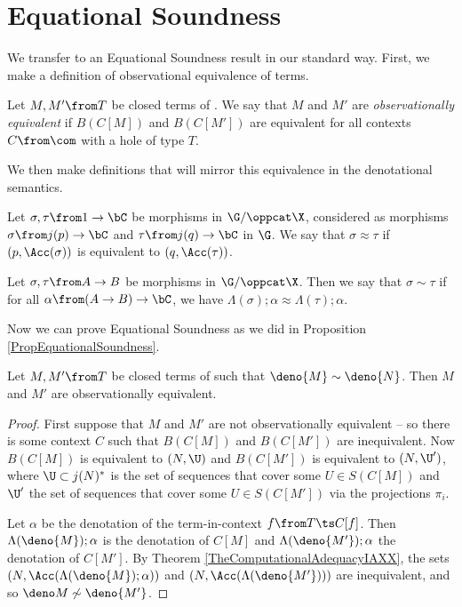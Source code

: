 \section{Equational Soundness}

We transfer to an Equational Soundness result in our standard way.
First, we make a definition of observational equivalence of \IAXX terms.

\begin{definition}
  Let $M,M'\from T$ be closed terms of \IAXX.  
  We say that $M$ and $M'$ are \emph{observationally equivalent} if $B(C[M])$ and $B(C[M'])$ are equivalent for all contexts $C\from \com$ with a hole of type $T$.
\end{definition}

We then make definitions that will mirror this equivalence in the denotational semantics.

\begin{definition}
  Let $\sigma,\tau\from 1 \to \bC$ be morphisms in $\G/\oppcat\X$, considered as morphisms $\sigma\from j(p) \to \bC$ and $\tau \from j(q) \to \bC$ in $\G$.  
  We say that $\sigma\approx\tau$ if $(p,\Acc(\sigma))$ is equivalent to $(q,\Acc(\tau))$.
\end{definition}

\begin{definition}
  Let $\sigma,\tau\from A \to B$ be morphisms in $\G/\oppcat\X$.  
  Then we say that $\sigma\sim\tau$ if for all $\alpha\from (A\to B) \to \bC$, we have $\Lambda(\sigma);\alpha \approx \Lambda(\tau);\alpha$.
\end{definition}

Now we can prove Equational Soundness as we did in Proposition \ref{PropEquationalSoundness}.

\begin{theorem}
  Let $M,M'\from T$ be closed terms of \IAXX such that $\deno{M}\sim\deno{N}$.
  Then $M$ and $M'$ are observationally equivalent.
\end{theorem}
\begin{proof}
  First suppose that $M$ and $M'$ are not observationally equivalent -- so there is some context $C$ such that $B(C[M])$ and $B(C[M'])$ are inequivalent.
  Now $B(C[M])$ is equivalent to $(N,\U)$ and $B(C[M'])$ is equivalent to $(N,\U')$, where $\U\subset j(N)^*$ is the set of sequences that cover some $U\in S(C[M])$ and $\U'$ the set of sequences that cover some $U\in S(C[M'])$ via the projections $\pi_i$.

  Let $\alpha$ be the denotation of the term-in-context $f\from T \ts C[f]$.  
  Then $\Lambda(\deno{M});\alpha$ is the denotation of $C[M]$ and $\Lambda(\deno{M'});\alpha$ the denotation of $C[M']$.  
  By Theorem \ref{TheComputationalAdequacyIAXX}, the sets $(N,\Acc(\Lambda(\deno{M});\alpha))$ and $(N,\Acc(\Lambda(\deno{M'})))$ are inequivalent, and so $\deno M \not\sim\deno{M'}$.
\end{proof}

